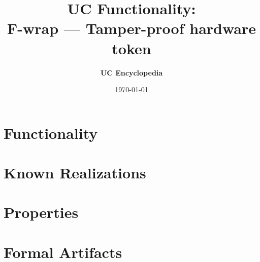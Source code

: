 \documentclass[11pt,a4paper]{article}
\title{\textbf{\Large UC Functionality:}\\[0.2em] \Large F-wrap --- Tamper-proof hardware token}
\author{\textbf{UC Encyclopedia}}
\date{\today}
\newtheorem{functionality}{Functionality}
\begin{document}
\maketitle

\begin{abstract}
\end{abstract}

\section{Functionality}

%

\section{Known Realizations}


\section{Properties}


\section{Formal Artifacts}

\end{document}
